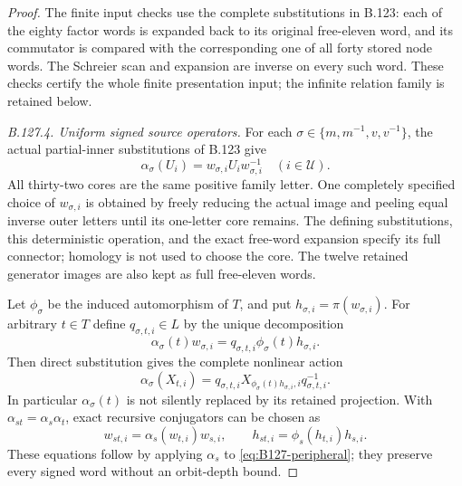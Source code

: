 \begin{proof}
The finite input checks use the complete substitutions in
B.123: each of the eighty factor words is expanded back to its
original free-eleven word, and its commutator is compared with
the corresponding one of all forty stored node words. The
Schreier scan and expansion are inverse on every such word.
These checks certify the whole finite presentation input;
the infinite relation family is retained below.

\emph{B.127.4. Uniform signed source operators.}
For each \(\sigma\in\{m,m^{-1},v,v^{-1}\}\), the actual
partial-inner substitutions of B.123 give
\begin{equation}\label{eq:B127-peripheral}
 \alpha_\sigma(U_i)=
       w_{\sigma,i}U_iw_{\sigma,i}^{-1}
       \quad (i\in\mathcal U).
\end{equation}
All thirty-two cores are the same positive family letter.
One completely specified choice of \(w_{\sigma,i}\) is obtained
by freely reducing the actual image and peeling equal inverse
outer letters until its one-letter core remains. The defining
substitutions, this deterministic operation, and the exact
free-word expansion specify its full connector; homology is
not used to choose the core. The twelve retained generator
images are also kept as full free-eleven words.

Let \(\phi_\sigma\) be the induced automorphism of \(T\), and
put \(h_{\sigma,i}=\pi(w_{\sigma,i})\). For arbitrary \(t\in T\)
define \(q_{\sigma,t,i}\in L\) by the unique decomposition
\[
 \alpha_\sigma(t)w_{\sigma,i}
   =q_{\sigma,t,i}\phi_\sigma(t)h_{\sigma,i}.
\]
Then direct substitution gives the complete nonlinear action
\begin{equation}\label{eq:B127-nonlinear}
 \alpha_\sigma(X_{t,i})
 =q_{\sigma,t,i}
   X_{\phi_\sigma(t)h_{\sigma,i},i}
   q_{\sigma,t,i}^{-1}.
\end{equation}
In particular \(\alpha_\sigma(t)\) is not silently replaced
by its retained projection. With
\(\alpha_{st}=\alpha_s\alpha_t\), exact recursive conjugators
can be chosen as
\begin{equation}\label{eq:B127-composition}
 w_{st,i}=\alpha_s(w_{t,i})w_{s,i},\qquad
 h_{st,i}=\phi_s(h_{t,i})h_{s,i}.
\end{equation}
These equations follow by applying \(\alpha_s\) to
\eqref{eq:B127-peripheral}; they preserve every signed word
without an orbit-depth bound.


\end{proof}
